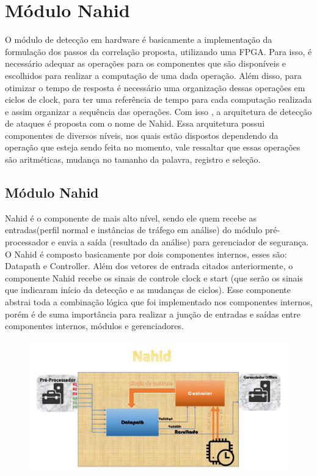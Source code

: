 \chapter{Módulo Nahid}
\label{CAP3}

O  módulo de detecção em hardware é basicamente a implementação da formulação dos passos da correlação proposta, utilizando uma FPGA. Para isso, é necessário adequar  as operações para os componentes que são disponíveis e escolhidos para realizar a computação de uma dada operação.  Além disso, para otimizar o tempo de resposta é necessário uma organização dessas operações em ciclos de clock, para ter uma referência de tempo  para cada computação realizada e assim organizar a sequência das operações. Com isso , a arquitetura de detecção de ataques é proposta com o nome de Nahid. Essa arquitetura possui componentes de diversos níveis, nos quais estão dispostos dependendo da operação que esteja sendo feita no momento, vale ressaltar que essas operações são aritméticas, mudança no tamanho da palavra, registro e seleção.  

\section{Módulo Nahid}\label{Sub:equa}

Nahid é o componente de mais alto nível, sendo ele quem recebe as entradas(perfil normal e instâncias de tráfego em análise) do módulo pré-processador e envia a saída (resultado da análise) para gerenciador de segurança. O Nahid é composto basicamente por dois componentes  internos, esses são: Datapath e Controller.  Além dos vetores de entrada citados anteriormente, o componente  Nahid recebe os sinais de controle clock e start (que serão os sinais que indicaram início da detecção e as mudanças de ciclos). Esse componente  abstrai toda a combinação lógica que foi implementado nos componentes  internos, porém é de suma importância para realizar a junção de entradas e saídas entre componentes internos, módulos e  gerenciadores. 
  \begin{figure}[t]
	\centering
	\includegraphics[width=12cm]{figures/nahid.jpg}\\
\end{figure}

